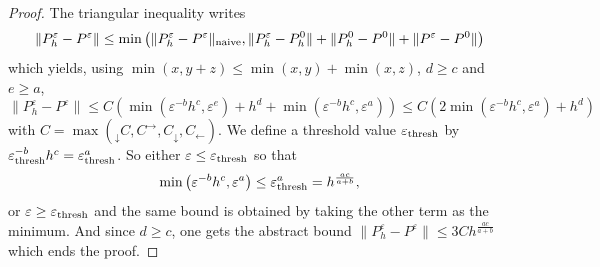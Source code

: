 \documentclass[a4paper,french,english,10pt]{article}
\newcommand\eps{\varepsilon}
\begin{document}
\begin{proof}
The triangular inequality writes
$$
\| P_h^\varepsilon - P^\varepsilon   \|
\leq
\min
\left(
\| P_h^\varepsilon - P^\varepsilon   \|_{ {\rm naive}},
\| P_h^\eps-P_h^0\|+
\| P_h^0 - P^0   \| +
\| P^\varepsilon - P^0 \|
\right)
$$
which yields, using $\min(x,y+z)\leq \min(x,y)+\min(x,z)$, $d\geq c$  and   $e\geq a$, 
\begin{equation} \label{eq:toutdebut}
\| P_h^\varepsilon - P^\varepsilon   \|
\leq
C\left(
\min\left(
 \varepsilon ^{-b}h^c,
\eps^e
\right)+h^d+\min
\left(
 \varepsilon ^{-b}h^c,
\eps^a
\right)
\right)
\leq C\left(
2\min  
\left(
 \varepsilon ^{-b}h^c,
\eps^a
\right) +h^d\right)
\end{equation}
with $C=\max\left( _\downarrow C,C^\rightarrow, C_\downarrow  ,  C_\leftarrow \right)$.
We define a  threshold value $\varepsilon_{\rm thresh} $
by  $\varepsilon_{\rm thresh}  ^{-b}h^c=
\eps_{\rm thresh}^a$. So either $\eps\leq \varepsilon_{\rm thresh} $
so that 
$$
\min
\left(
 \varepsilon ^{-b}h^c,
\eps^a
\right)\leq \varepsilon_{\rm thresh}^a =h^{\frac{ac}{a+b}  },
$$ 
or 
$\eps\geq \varepsilon_{\rm thresh} $ and the same bound is obtained by 
taking the other term as the minimum.
And since $d\geq c$, one gets the abstract bound
$
\| P_h^\varepsilon - P^\varepsilon   \|
\leq
3Ch^{\frac{ac}{a+b}  }
$ which ends the proof.
\end{proof}
\end{document}
